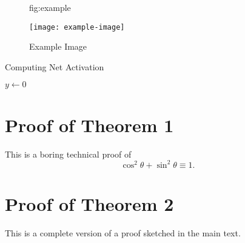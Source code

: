 \documentclass{midl} %
\begin{document}
\begin{figure}[htbp]
\floatconts
  {fig:example}
  {\caption{Example Image}}
  {\texttt{[image: example-image]}}
\end{figure}

\begin{algorithm2e}
\caption{Computing Net Activation}
\label{alg:net}
{}
$y\leftarrow 0$\;
\end{algorithm2e}






\appendix

\section{Proof of Theorem 1}

This is a boring technical proof of
\begin{equation}\label{eq:example}
\cos^2\theta + \sin^2\theta \equiv 1.
\end{equation}

\section{Proof of Theorem 2}

This is a complete version of a proof sketched in the main text.
\end{document}
